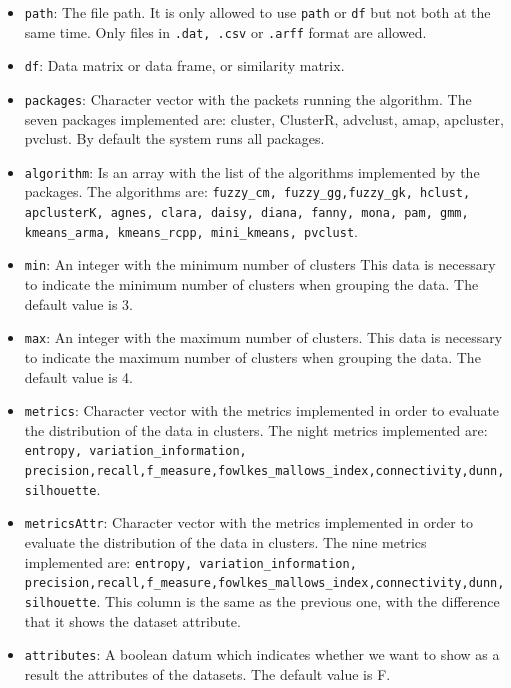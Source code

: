 \documentclass[
]{article}
\providecommand{\tightlist}{%
  \setlength{\itemsep}{0pt}\setlength{\parskip}{0pt}}
\begin{document}
\begin{itemize}
\tightlist
\item
  \texttt{path}: The file path. It is only allowed to use \texttt{path}
  or \texttt{df} but not both at the same time. Only files in
  \texttt{.dat, .csv} or \texttt{.arff} format are allowed.
\item
  \texttt{df}: Data matrix or data frame, or similarity matrix.
\item
  \texttt{packages}: Character vector with the packets running the
  algorithm. The seven packages implemented are: cluster, ClusterR,
  advclust, amap, apcluster, pvclust. By default the system runs
  all packages.
\item
  \texttt{algorithm}: Is an array with the list of the algorithms
  implemented by the packages. The algorithms are:
  \texttt{fuzzy\_cm, fuzzy\_gg,fuzzy\_gk, hclust, apclusterK, agnes, clara, daisy, diana, fanny, mona, pam, gmm, kmeans\_arma, kmeans\_rcpp, mini\_kmeans, pvclust}.
\item
  \texttt{min}: An integer with the minimum number of clusters This data
  is necessary to indicate the minimum number of clusters when grouping
  the data. The default value is 3.
\item
  \texttt{max}: An integer with the maximum number of clusters. This
  data is necessary to indicate the maximum number of clusters when
  grouping the data. The default value is 4.
\item
  \texttt{metrics}: Character vector with the metrics implemented in
  order to evaluate the distribution of the data in clusters. The night
  metrics implemented are:
  \texttt{entropy, variation\_information, precision,recall,f\_measure,fowlkes\_mallows\_index,connectivity,dunn,silhouette}.
\item
  \texttt{metricsAttr}: Character vector with the metrics implemented in
  order to evaluate the distribution of the data in clusters. The nine
  metrics implemented are:
  \texttt{entropy, variation\_information, precision,recall,f\_measure,fowlkes\_mallows\_index,connectivity,dunn,silhouette}.
  This column is the same as the previous one, with the difference that
  it shows the dataset attribute.
\item
  \texttt{attributes}: A boolean datum which indicates whether we want
  to show as a result the attributes of the datasets. The default value
  is F.
\end{itemize}
\end{document}
